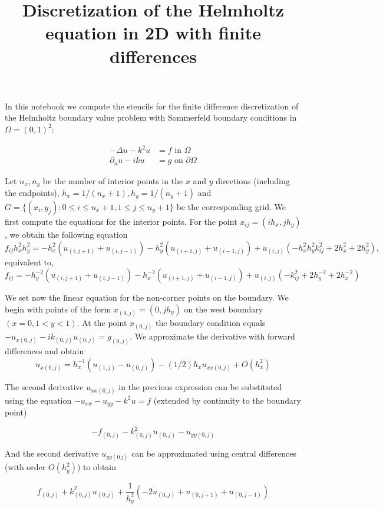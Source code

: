 \documentclass[a4paper, landscape, 11pt]{article}
\title{Discretization of the Helmholtz equation in 2D with finite differences}
\begin{document}
    
    
    \maketitle
  

    In this notebook we compute the stencils for the finite difference
discretization of the Helmholtz boundary value problem with Sommerfeld
boundary conditions in \(\Omega=(0,1)^2\):

\begin{align*}-\Delta u - k^2 u &= f \text{ in $\Omega$}\\
 \partial_{n}u - iku &=g \text{ on $\partial \Omega$}
\end{align*}

Let \(n_x,n_y\) be the number of interior points in the \(x\) and \(y\)
directions (including the endpoints), \(h_x=1/(n_x+1), h_y=1/(n_y+1)\)
and \(G=\{(x_i,y_j): 0 \leq i \leq n_x+1, 1 \leq j \leq n_y+1\}\) be the
corresponding grid. We first compute the equations for the interior
points.
    For the point \(x_{ij}=(ih_x,jh_y)\), we obtain the following equation
\[f_{ij}h_{x}^{2}h_{y}^{2}=- h_{x}^{2} \left(u_{{(i,j+1)}} + u_{{(i,j-1)}}\right) - h_{y}^{2} \left(u_{{(i+1,j)}} + u_{{(i-1,j)}}\right) + u_{{(i,j)}} \left(- h_{x}^{2} h_{y}^{2} k_{ij}^{2} + 2 h_{x}^{2} + 2 h_{y}^{2}\right),\]
equivalent to,
\[ f_{ij}=- h_{y}^{-2} \left(u_{{(i,j+1)}} + u_{{(i,j-1)}}\right) - h_{x}^{-2} \left(u_{{(i+1,j)}} + u_{{(i-1,j)}}\right) + u_{{(i,j)}} \left(-k_{ij}^{2} + 2 h_{y}^{-2} + 2 h_{x}^{-2}\right)\]

    We set now the linear equation for the non-corner points on the
boundary. We begin with points of the form \(x_{(0,j)}=(0,jh_y)\) on the
west boundary \((x=0, 1<y<1)\). At the point \(x_{(0,j)}\) the boundary
condition equals \(-u_{x(0,j)}-ik_{(0,j)}u_{(0,j)}=g_{(0,j)}\). We
approximate the derivative with forward differences and obtain
\[u_{x(0,j)}=h_x^{-1}(u_{(1,j)}-u_{(0,j)})-(1/2)h_xu_{xx(0,j)}+O(h_x^2)\]

    The second derivative \(u_{xx(0,j)}\) in the previous expression can be
substituted using the equation \(-u_{xx}-u_{yy}-k^2u=f\) (extended by
continuity to the boundary point)
    
    \[- f_{(0,j)} - k_{(0,j)}^{2} u_{(0,j)} - u_{yy(0,j)}\]


    And the second derivative \(u_{yy(0\,j)}\) can be approximated using
central differences (with order \(O(h_y^2)\)) to obtain
    
    \[f_{(0,j)} + k_{(0,j)}^{2} u_{(0,j)} + \frac{1}{h_{y}^{2}} \left(- 2 u_{(0,j)} + u_{(0,j+1)} + u_{(0,j-1)}\right)\]
\end{document}

